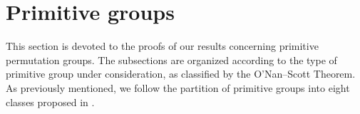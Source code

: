 \documentclass[a4paper]{amsart}
\theoremstyle{definition}
\begin{document}

\section{Primitive groups} \label{sec:primitive}
This section is devoted to the proofs of our results concerning primitive permutation groups. The subsections are organized according to the type of primitive group under consideration, as classified by the O'Nan–Scott Theorem. As previously mentioned, we follow the partition of primitive groups into eight classes proposed in \cite{Praeger1997}.
\end{document}
